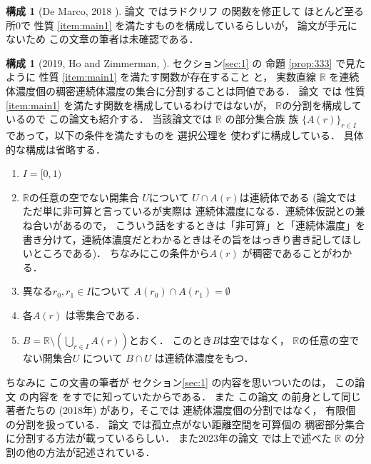 \documentclass[leqno, a4paper, 12pt]{jsarticle}
\theoremstyle{definition}
\newtheorem{con}[thm]{構成}
\newcommand{\rr}{\mathbb{R}}
\begin{document}
\begin{con}[De Marco, 2018 \cite{MR3756332}]\label{con:dem}
論文\cite{MR3756332}
ではラドクリフ
\cite{MR3453542}
の関数を修正して
ほとんど至る所$0$で
性質
\ref{item:main1}
を満たすものを構成しているらしいが，
論文が手元にないため
この文章の筆者は未確認である．
\end{con}


\begin{con}[2019, Ho and Zimmerman, \cite{MR4022760}]\label{con:hz}
セクション\ref{sec:1}
の
命題
\ref{prop:333}
で見たように
性質
\ref{item:main1}
を満たす関数が存在すること
と，
実数直線
$\rr$
を連続体濃度個の稠密連続体濃度の集合に分割することは同値である．
論文
\cite{MR4022760}
では
性質
\ref{item:main1}
を満たす関数を構成しているわけではないが，
$\rr$の分割を構成しているので
この論文も紹介する．
当該論文では
$\rr$
の部分集合族
族
$\{A(r)\}_{r\in I}$
であって，以下の条件を満たすものを
選択公理を
使わずに構成している．
具体的な構成は省略する．
\begin{enumerate}[label=\textup{(\arabic*)}]
\item 
$I=[0, 1)$
\item $\rr$の任意の空でない開集合
$U$について
$U\cap A(r)$は連続体である
(論文ではただ単に非可算と言っているが実際は
連続体濃度になる．連続体仮説との兼ね合いがあるので，
こういう話をするときは「非可算」と「連続体濃度」を書き分けて，連続体濃度だとわかるときはその旨をはっきり書き記してほしいところである)．
ちなみにこの条件から$A(r)$
が稠密であることがわかる．
\item 
異なる$r_{0}, r_{1}\in I$について
$A(r_{0})\cap A(r_{1})=\emptyset$
\item 
各$A(r)$
は零集合である．
\item 
$B=\rr\setminus \left(\bigcup_{r\in I}A(r)\right)$とおく．
このとき$B$は空ではなく，
$\rr$の任意の空でない開集合$U$
について
$B\cap U$
は連続体濃度をもつ．
\end{enumerate}
ちなみに
この文書の筆者が
セクション\ref{sec:1}
の内容を思いついたのは，
この論文
\cite{MR4022760}の内容を
をすでに知っていたからである．
また
この論文
\cite{MR4022760}
の前身として同じ著者たちの
\cite{MR3779220}(2018年)
があり，そこでは
連続体濃度個の分割ではなく，
有限個の分割を扱っている．
論文
\cite{MR3418216}
では孤立点がない距離空間を可算個の
稠密部分集合に分割する方法が載っているらしい．
また2023年の論文
\cite{MR4573491}
では上で述べた
$\rr$
の分割の他の方法が記述されている．
\end{con}
\end{document}
